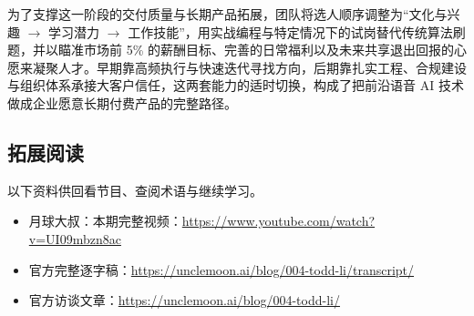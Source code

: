 \documentclass[UTF8,a4paper,11pt,fontset=fandol]{ctexart}
\begin{document}
为了支撑这一阶段的交付质量与长期产品拓展，团队将选人顺序调整为“文化与兴趣 \ensuremath{\rightarrow} 学习潜力 \ensuremath{\rightarrow} 工作技能”，用实战编程与特定情况下的试岗替代传统算法刷题，并以瞄准市场前 5\% 的薪酬目标、完善的日常福利以及未来共享退出回报的心愿来凝聚人才。早期靠高频执行与快速迭代寻找方向，后期靠扎实工程、合规建设与组织体系承接大客户信任，这两套能力的适时切换，构成了把前沿语音 AI 技术做成企业愿意长期付费产品的完整路径。
\subsection{拓展阅读}
以下资料供回看节目、查阅术语与继续学习。
\begin{itemize}
\item 月球大叔：本期完整视频：\url{https://www.youtube.com/watch?v=UI09mbzn8ac}
\item 官方完整逐字稿：\url{https://unclemoon.ai/blog/004-todd-li/transcript/}
\item 官方访谈文章：\url{https://unclemoon.ai/blog/004-todd-li/}
\end{itemize}
\end{document}
